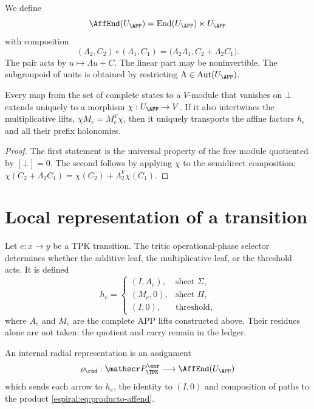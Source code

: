 We define
\[
 \AffEnd(U_{\APP})
 =\operatorname{End}(U_{\APP})\ltimes U_{\APP}
\]
with composition
\begin{equation}
 (\Lambda_2,C_2)\circ(\Lambda_1,C_1)
 =\bigl(\Lambda_2\Lambda_1,
 C_2+\Lambda_2C_1\bigr).
 \label{espiral:eq:producto-affend}
\end{equation}
The pair acts by \(u\mapsto\Lambda u+C\). The linear part may be
noninvertible. The subgroupoid of units is obtained by restricting
\(\Lambda\in\operatorname{Aut}(U_{\APP})\).

\begin{proposition}
Every map from the set of complete states to a \(V\)-module that vanishes
on \(\bot\) extends uniquely to a morphism
\(\chi:U_{\APP}\to V\). If it also intertwines the multiplicative
lifts, \(\chi M_e=M_e^V\chi\), then it uniquely transports
the affine factors \(h_e\) and all their prefix holonomies.
\end{proposition}
\begin{proof}
The first statement is the universal property of the free module quotiented
by \([\bot]=0\). The second follows by applying \(\chi\) to the semidirect
composition: \(\chi(C_2+\Lambda_2C_1)=
\chi(C_2)+\Lambda_2^V\chi(C_1)\).
\end{proof}

\section{Local representation of a transition}

Let \(e:x\to y\) be a TPK transition. The tritic operational-phase selector
determines whether the additive leaf, the multiplicative leaf, or the threshold acts. It is defined
\begin{equation}
 h_e=
 \begin{cases}
 (I,A_e),&\text{sheet }\Sigma,\\
 (M_e,0),&\text{sheet }\Pi,\\
 (I,0),&\text{threshold},
 \end{cases}
 \label{espiral:eq:factor-afin-local}
\end{equation}
where \(A_e\) and \(M_e\) are the complete APP lifts constructed
above. Their residues alone are not taken: the quotient and carry remain
in the ledger.

\begin{definition}
An internal radial representation is an assignment
\[
 \rho_{\rad}:\mathscr P_{\TPK}^{\enr}
 \longrightarrow\AffEnd(U_{\APP})
\]
which sends each arrow to \(h_e\), the identity to \((I,0)\) and composition
of paths to the product \cref{espiral:eq:producto-affend}.
\end{definition}


